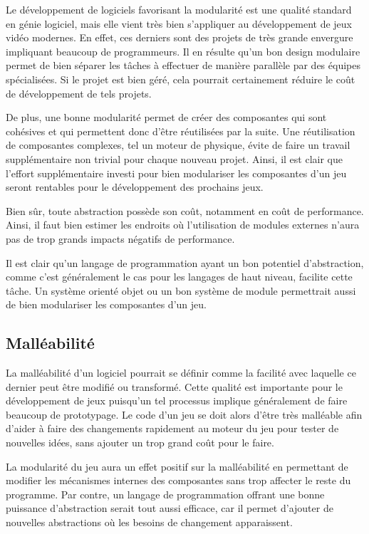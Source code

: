 \documentclass[12pt,twoside,letterpaper,francais]{book}
\begin{document}
Le dévelop\-pement de logiciels favorisant la modularité est une
qualité standard en génie logiciel, mais elle vient très bien
s'appliquer au dévelop\-pement de jeux vidéo modernes. En effet, ces
derniers sont des projets de très grande envergure impliquant beaucoup
de programmeurs. Il en résulte qu'un bon design modulaire permet de
bien séparer les tâches à effectuer de manière parallèle par des
équipes spécialisées. Si le projet est bien géré, cela pourrait
certainement réduire le coût de dévelop\-pement de tels projets.

De plus, une bonne modularité permet de créer des composantes qui sont
cohésives et qui permettent donc d'être réutilisées par la suite. Une
réutilisation de composantes complexes, tel un moteur de physique,
évite de faire un travail supplémentaire non trivial pour chaque
nouveau projet. Ainsi, il est clair que l'effort supplémentaire
investi pour bien modulariser les composantes d'un jeu seront
rentables pour le dévelop\-pement des prochains jeux.

Bien sûr, toute abstraction possède son coût, notamment en coût de
performance. Ainsi, il faut bien estimer les endroits où l'utilisation
de modules externes n'aura pas de trop grands impacts négatifs de
performance.

Il est clair qu'un langage de programmation ayant un bon potentiel
d'abstraction, comme c'est généralement le cas pour les langages de
haut niveau, facilite cette tâche. Un système orienté objet ou un bon
système de module permettrait aussi de bien modulariser les
composantes d'un jeu.

\FloatBarrier
\subsection{Malléabilité}
La malléabilité d'un logiciel pourrait se définir comme la facilité
avec laquelle ce dernier peut être modifié ou transformé. Cette
qualité est importante pour le dévelop\-pement de jeux puisqu'un tel
processus implique généralement de faire beaucoup de prototypage. Le
code d'un jeu se doit alors d'être très malléable afin d'aider à faire
des changements rapidement au moteur du jeu pour tester de nouvelles
idées, sans ajouter un trop grand coût pour le faire.

La modularité du jeu aura un effet positif sur la malléabilité en
permettant de modifier les mécanismes internes des composantes sans
trop affecter le reste du programme. Par contre, un langage de
programmation offrant une bonne puissance d'abstraction serait tout
aussi efficace, car il permet d'ajouter de nouvelles abstractions où
les besoins de changement apparaissent.
\end{document}
